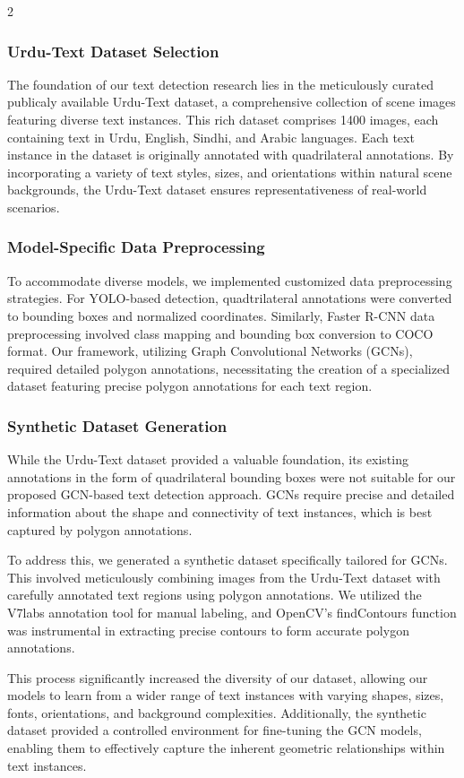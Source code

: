 \documentclass[sn-mathphys,Numbered]{sn-jnl}%
\begin{document}
\begin{multicols}{2}
\subsubsection{Urdu-Text Dataset Selection}
The foundation of our text detection research lies in the meticulously curated publicaly available Urdu-Text dataset\cite{urcutext}, a comprehensive collection of scene images featuring diverse text instances. This rich dataset comprises 1400 images, each containing text in Urdu, English, Sindhi, and Arabic languages. Each text instance in the dataset is originally annotated with quadrilateral annotations. By incorporating a variety of text styles, sizes, and orientations within natural scene backgrounds, the Urdu-Text dataset ensures representativeness of real-world scenarios.

\subsubsection{Model-Specific Data Preprocessing}
To accommodate diverse models, we implemented customized data preprocessing strategies. For YOLO-based detection, quadtrilateral annotations were converted to bounding boxes and normalized coordinates. Similarly, Faster R-CNN data preprocessing involved class mapping and bounding box conversion to COCO format. Our framework, utilizing Graph Convolutional Networks (GCNs), required detailed polygon annotations, necessitating the creation of a specialized dataset featuring precise polygon annotations for each text region.
\subsubsection{Synthetic Dataset Generation}
While the Urdu-Text dataset provided a valuable foundation, its existing annotations in the form of quadrilateral bounding boxes were not suitable for our proposed GCN-based text detection approach. GCNs require precise and detailed information about the shape and connectivity of text instances, which is best captured by polygon annotations.

To address this, we generated a synthetic dataset specifically tailored for GCNs. This involved meticulously combining images from the Urdu-Text dataset with carefully annotated text regions using polygon annotations. We utilized the V7labs annotation tool for manual labeling, and OpenCV's findContours function was instrumental in extracting precise contours to form accurate polygon annotations.

This process significantly increased the diversity of our dataset, allowing our models to learn from a wider range of text instances with varying shapes, sizes, fonts, orientations, and background complexities. Additionally, the synthetic dataset provided a controlled environment for fine-tuning the GCN models, enabling them to effectively capture the inherent geometric relationships within text instances.


\end{multicols}
\end{document}
